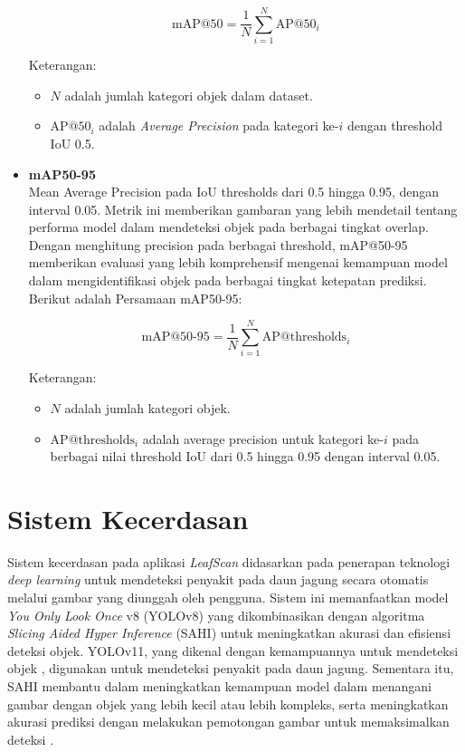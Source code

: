 \documentclass[journal,article,submit,pdftex,moreauthors]{Definitions/mdpi}
\begin{document}
\begin{itemize}
    \[
        \text{mAP@50} = \frac{1}{N} \sum_{i=1}^{N} \text{AP@50}_i
    \]
    
    Keterangan:
    \begin{itemize}
        \setlength{\itemindent}{1em} %
       \item \( N \) adalah jumlah kategori objek dalam dataset.
    \item \( \text{AP@50}_i \) adalah \textit{Average Precision} pada kategori ke-\( i \) dengan threshold IoU 0.5.
    \end{itemize}

    \item \textbf{mAP50-95} \\
    Mean Average Precision pada IoU thresholds dari 0.5 hingga 0.95, dengan interval 0.05. Metrik ini memberikan gambaran yang lebih mendetail tentang performa model dalam mendeteksi objek pada berbagai tingkat overlap. Dengan menghitung precision pada berbagai threshold, mAP@50-95 memberikan evaluasi yang lebih komprehensif mengenai kemampuan model dalam mengidentifikasi objek pada berbagai tingkat ketepatan prediksi\cite{Zhang2021}.
    Berikut adalah Persamaan mAP50-95:
    
    \[
      \text{mAP@50-95} = \frac{1}{N} \sum_{i=1}^{N} \text{AP@thresholds}_i
    \]

    
    Keterangan:
    \begin{itemize}
        \setlength{\itemindent}{1em} %
          \item \( N \) adalah jumlah kategori objek.
    \item \( \text{AP@thresholds}_i \) adalah average precision untuk kategori ke-\( i \) pada berbagai nilai threshold IoU dari 0.5 hingga 0.95 dengan interval 0.05.
    \end{itemize}

    

\end{itemize}


\section{Sistem Kecerdasan}
Sistem kecerdasan pada aplikasi \textit{LeafScan} didasarkan pada penerapan teknologi \textit{deep learning} untuk mendeteksi penyakit pada daun jagung secara otomatis melalui gambar yang diunggah oleh pengguna. Sistem ini memanfaatkan model \textit{You Only Look Once} v8 (YOLOv8) yang dikombinasikan dengan algoritma \textit{Slicing Aided Hyper Inference} (SAHI) untuk meningkatkan akurasi dan efisiensi deteksi objek. YOLOv11, yang dikenal dengan kemampuannya untuk mendeteksi objek \cite{YIN2020}, digunakan untuk mendeteksi penyakit pada daun jagung. Sementara itu, SAHI membantu dalam meningkatkan kemampuan model dalam menangani gambar dengan objek yang lebih kecil atau lebih kompleks, serta meningkatkan akurasi prediksi dengan melakukan pemotongan gambar untuk memaksimalkan deteksi \cite{AKYON2022}.
\end{document}
